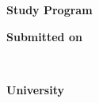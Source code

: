 {\vspace*{6.3mm}
\textbf{Study Program} \tab
\begin{minipage}[t]{\textwidth-\CurrentLineWidth}
\getStudyProgram\strut
\end{minipage}

\vspace*{6.3mm}
\textbf{Submitted on} \tab
\begin{minipage}[t]{\textwidth-\CurrentLineWidth}
\getSubmissionDate{}\\
{\selectfont {\getEmail}}
\end{minipage}

\vspace*{6.3mm}
\textbf{University} \tab
\getUniversity


}
\newpage